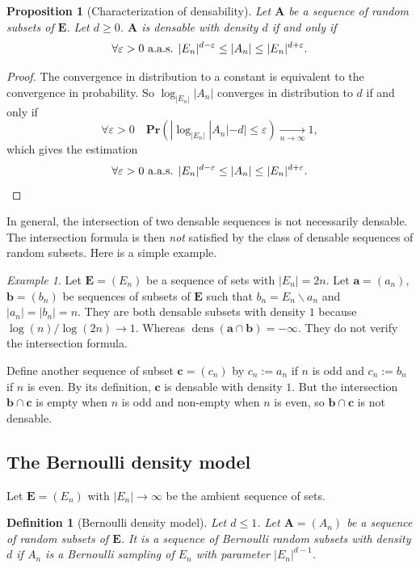 \documentclass{article}
\DeclareMathOperator{\dens}{dens}
\newcommand{\bs}{\boldsymbol}
\newcommand{\tendvers}{\xrightarrow[n\to\infty]{}}
\def\Pr{\mathbf{Pr}}
\newtheorem{defi}[thm]{Definition}
\newtheorem{prop}[thm]{Proposition}
\theoremstyle{remark}
\newtheorem{ex}[thm]{Example}
\begin{document}
\begin{prop}[Characterization of densability]\label{Concentration}
Let $\bs A$ be a sequence of random subsets of $\bs E$. Let $d\geq 0$. $\bs A$ is densable with density $d$ if and only if
\[\forall \varepsilon > 0 \textup{ a.a.s. } |E_n|^{d-\varepsilon}\leq |A_n|\leq |E_n|^{d+\varepsilon}. \]
\end{prop}
\begin{proof}
The convergence in distribution to a constant is equivalent to the convergence in probability. So $\log_{|E_n|}|A_n|$ converges in distribution to $d$ if and only if
\[\forall \varepsilon > 0 \quad \Pr(|\log_{|E_n|}|A_n|-d|\leq \varepsilon)\tendvers 1,\]
which gives the estimation
\[\forall \varepsilon > 0 \textup{ a.a.s. } |E_n|^{d-\varepsilon}\leq |A_n|\leq |E_n|^{d+\varepsilon}.\]
\end{proof}


In general, the intersection of two densable sequences is not necessarily densable. The intersection formula is then \textit{not} satisfied by the class of densable sequences of random subsets. Here is a simple example.

\begin{ex} Let $\bs E = (E_n)$ be a sequence of sets with $|E_n| = 2n$. Let $\bs a = (a_n)$, $\bs b = (b_n)$ be sequences of subsets of $\bs E$ such that $b_n = E_n\backslash a_n$ and $|a_n|=|b_n|=n$. They are both densable subsets with density $1$ because $\log (n)/\log (2n)\to 1$. Whereas $\dens (\bs a\cap \bs b) = -\infty$. They do not verify the intersection formula.

Define another sequence of subset $\bs c = (c_n)$ by $c_n := a_n$ if $n$ is odd and $c_n := b_n$ if $n$ is even. By its definition, $\bs c$ is densable with density $1$. But the intersection $\bs b\cap \bs c$ is empty when $n$ is odd and non-empty when $n$ is even, so $\bs b\cap \bs c$ is not densable.
\end{ex}\quad

\subsection{The Bernoulli density model}

Let $\bs E = (E_n)$ with $|E_n|\to\infty$ be the ambient sequence of sets.

\begin{defi}[Bernoulli density model]
Let $d\leq 1$. Let $\bs{A} = (A_n)$  be a sequence of random subsets of $\bs E$. It is a sequence of Bernoulli random subsets with density $d$ if $A_n$ is a Bernoulli sampling of $E_n$ with parameter $|E_n|^{d-1}$.
\end{defi}
\end{document}
